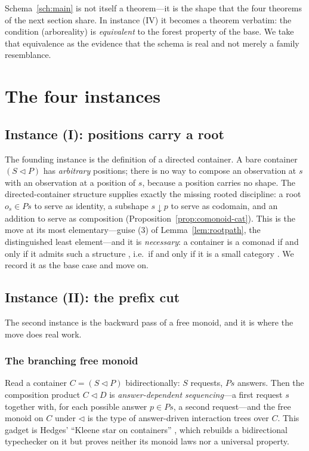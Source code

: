 \documentclass[11pt,reqno]{amsart}
\theoremstyle{plain}
\theoremstyle{definition}
\begin{document}
Schema~\ref{sch:main} is not itself a theorem---it is the shape that the four theorems of the next
section share. In instance (IV) it becomes a theorem verbatim: the condition (arboreality) is
\emph{equivalent} to the forest property of the base. We take that equivalence as the evidence that the
schema is real and not merely a family resemblance.

\section{The four instances}\label{sec:instances}

\subsection{Instance (I): positions carry a root}\label{sec:root}
The founding instance is the definition of a directed container. A bare container $(S \triangleleft P)$
has \emph{arbitrary} positions; there is no way to compose an observation at $s$ with an observation at a
position of $s$, because a position carries no shape. The directed-container structure supplies exactly
the missing rooted discipline: a root $o_s \in P s$ to serve as identity, a subshape $s \downarrow p$ to
serve as codomain, and an addition to serve as composition (Proposition~\ref{prop:comonoid-cat}). This is
the move at its most elementary---guise (3) of Lemma~\ref{lem:rootpath}, the distinguished least
element---and it is \emph{necessary}: a container is a comonad if and only if it admits such a structure
\cite{AhmanChapmanUustalu2014}, i.e.\ if and only if it is a small category \cite{AhmanUustalu2016}. We
record it as the base case and move on.

\subsection{Instance (II): the prefix cut}\label{sec:prefix}
The second instance is the backward pass of a free monoid, and it is where the move does real work.

\subsubsection{The branching free monoid}
Read a container $C = (S \triangleleft P)$ bidirectionally: $S$ requests, $P s$ answers. Then the
composition product $C \triangleleft D$ is \emph{answer-dependent sequencing}---a first request $s$
together with, for each possible answer $p \in P s$, a second request---and the free monoid on $C$ under
$\triangleleft$ is the type of answer-driven interaction trees over $C$. This gadget is Hedges'
``Kleene star on containers'' \cite{Hedges2025}, which rebuilds a bidirectional typechecker on it but
proves neither its monoid laws nor a universal property.
\end{document}
